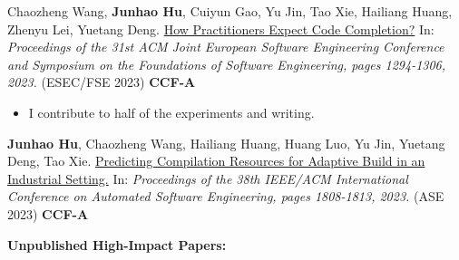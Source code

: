 \begin{enumerate}[label={[\arabic*]}]
    \item Chaozheng Wang, \textbf{Junhao Hu}, Cuiyun Gao, Yu Jin, Tao Xie, Hailiang Huang, Zhenyu Lei, Yuetang Deng. \href{https://dl.acm.org/doi/10.1145/3611643.3616280}{\color{cyan} How Practitioners Expect Code Completion?} In: \textit{Proceedings of the 31st ACM Joint European Software Engineering Conference and Symposium on the Foundations of Software Engineering, pages 1294-1306, 2023.} (ESEC/FSE 2023) \textbf{CCF-A}
    \begin{itemize}
        \item I contribute to half of the experiments and writing.
    \end{itemize}

    \item \textbf{Junhao Hu}, Chaozheng Wang, Hailiang Huang, Huang Luo, Yu Jin, Yuetang Deng, Tao Xie. \href{https://ieeexplore.ieee.org/document/10298501}{\color{cyan} Predicting Compilation Resources for Adaptive Build in an Industrial Setting.} In: \textit{Proceedings of the 38th IEEE/ACM International Conference on Automated Software Engineering, pages 1808-1813, 2023.} (ASE 2023) \textbf{CCF-A}\\
\end{enumerate}


\textbf{Unpublished High-Impact Papers:}

